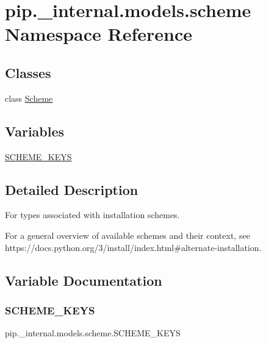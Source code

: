 \hypertarget{namespacepip_1_1__internal_1_1models_1_1scheme}{}\section{pip.\+\_\+internal.\+models.\+scheme Namespace Reference}
\label{namespacepip_1_1__internal_1_1models_1_1scheme}
\subsection*{Classes}
\begin{DoxyCompactItemize}
\item 
class \hyperlink{classpip_1_1__internal_1_1models_1_1scheme_1_1Scheme}{Scheme}
\end{DoxyCompactItemize}
\subsection*{Variables}
\begin{DoxyCompactItemize}
\item 
\hyperlink{namespacepip_1_1__internal_1_1models_1_1scheme_ae09f9202bf1211ad9942019de4962eee}{S\+C\+H\+E\+M\+E\+\_\+\+K\+E\+YS}
\end{DoxyCompactItemize}


\subsection{Detailed Description}
\begin{DoxyVerb}For types associated with installation schemes.

For a general overview of available schemes and their context, see
https://docs.python.org/3/install/index.html#alternate-installation.
\end{DoxyVerb}
 

\subsection{Variable Documentation}
\mbox{\label{namespacepip_1_1__internal_1_1models_1_1scheme_ae09f9202bf1211ad9942019de4962eee}} 
\subsubsection{\texorpdfstring{S\+C\+H\+E\+M\+E\+\_\+\+K\+E\+YS}{SCHEME\_KEYS}}
{\footnotesize\ttfamily pip.\+\_\+internal.\+models.\+scheme.\+S\+C\+H\+E\+M\+E\+\_\+\+K\+E\+YS}

